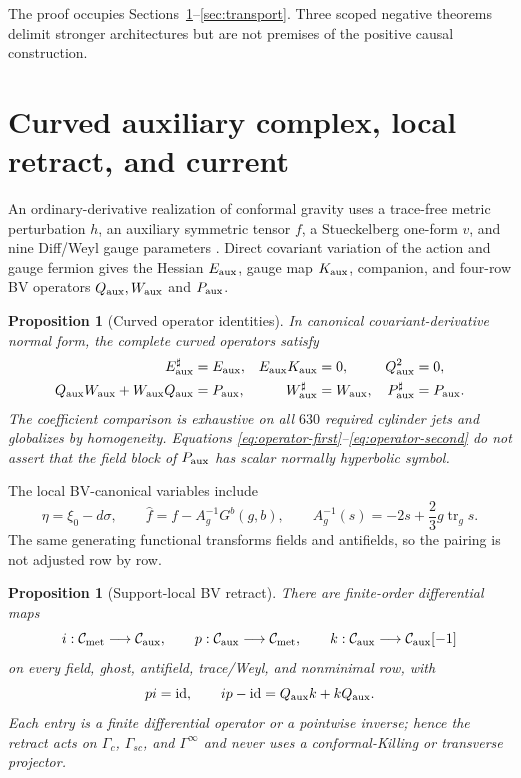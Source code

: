 \documentclass[11pt]{article}
\newtheorem{proposition}[theorem]{Proposition}
\theoremstyle{definition}
\theoremstyle{remark}
\newcommand{\cC}{\mathcal C}
\newcommand{\id}{\mathrm{id}}
\begin{document}
The proof occupies Sections~\ref{sec:auxiliary}--\ref{sec:transport}.  Three
scoped negative theorems delimit stronger architectures but are not premises
of the positive causal construction.

\section{Curved auxiliary complex, local retract, and current}
\label{sec:auxiliary}

An ordinary-derivative realization of conformal gravity uses a trace-free
metric perturbation $h$, an auxiliary symmetric tensor $f$, a Stueckelberg
one-form $v$, and nine Diff/Weyl gauge parameters
\cite{MetsaevOrdinaryDerivative}.  Direct covariant variation of the action
and gauge fermion gives the Hessian $E_{\rm aux}$, gauge map $K_{\rm aux}$,
companion, and four-row BV operators $Q_{\rm aux},W_{\rm aux}$ and
$P_{\rm aux}$.

\begin{proposition}[Curved operator identities]\label{prop:operators}
In canonical covariant-derivative normal form, the complete curved operators
satisfy
\begin{align}
 E_{\rm aux}^\sharp&=E_{\rm aux},
 &E_{\rm aux}K_{\rm aux}&=0,
 &Q_{\rm aux}^2&=0,\label{eq:operator-first}\\
 Q_{\rm aux}W_{\rm aux}+W_{\rm aux}Q_{\rm aux}&=P_{\rm aux},
 &W_{\rm aux}^\sharp&=W_{\rm aux},
 &P_{\rm aux}^\sharp&=P_{\rm aux}.\label{eq:operator-second}
\end{align}
The coefficient comparison is exhaustive on all $630$ required cylinder
jets and globalizes by homogeneity.  Equations
\eqref{eq:operator-first}--\eqref{eq:operator-second} do not assert that the
field block of $P_{\rm aux}$ has scalar normally hyperbolic symbol.
\end{proposition}

The local BV-canonical variables include
\begin{equation}\label{eq:aux-shift}
 \eta=\xi_0-d\sigma,
 \qquad
 \widehat f=f-A_g^{-1}G^b(g,b),
 \qquad
 A_g^{-1}(s)=-2s+\frac23g\operatorname{tr}_g s.
\end{equation}
The same generating functional transforms fields and antifields, so the
pairing is not adjusted row by row.

\begin{proposition}[Support-local BV retract]\label{prop:aux-SDR}
There are finite-order differential maps
\begin{equation}
 i:\cC_{\rm met}\longrightarrow\cC_{\rm aux},
 \qquad p:\cC_{\rm aux}\longrightarrow\cC_{\rm met},
 \qquad k:\cC_{\rm aux}\longrightarrow\cC_{\rm aux}[-1]
\end{equation}
on every field, ghost, antifield, trace/Weyl, and nonminimal row, with
\begin{equation}\label{eq:aux-SDR}
 p i=\id,
 \qquad i p-\id=Q_{\rm aux}k+kQ_{\rm aux}.
\end{equation}
Each entry is a finite differential operator or a pointwise inverse; hence
the retract acts on $\Gamma_c$, $\Gamma_{sc}$, and $\Gamma^\infty$ and never
uses a conformal-Killing or transverse projector.
\end{proposition}
\end{document}
